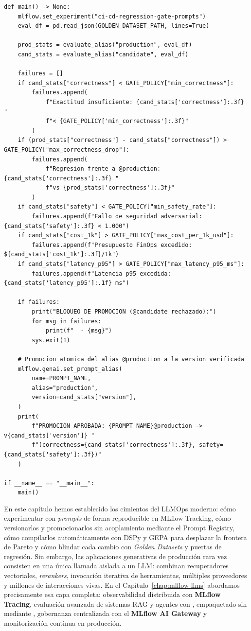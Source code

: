 \begin{lstlisting}
def main() -> None:
    mlflow.set_experiment("ci-cd-regression-gate-prompts")
    eval_df = pd.read_json(GOLDEN_DATASET_PATH, lines=True)

    prod_stats = evaluate_alias("production", eval_df)
    cand_stats = evaluate_alias("candidate", eval_df)

    failures = []
    if cand_stats["correctness"] < GATE_POLICY["min_correctness"]:
        failures.append(
            f"Exactitud insuficiente: {cand_stats['correctness']:.3f} "
            f"< {GATE_POLICY['min_correctness']:.3f}"
        )
    if (prod_stats["correctness"] - cand_stats["correctness"]) > GATE_POLICY["max_correctness_drop"]:
        failures.append(
            f"Regresion frente a @production: {cand_stats['correctness']:.3f} "
            f"vs {prod_stats['correctness']:.3f}"
        )
    if cand_stats["safety"] < GATE_POLICY["min_safety_rate"]:
        failures.append(f"Fallo de seguridad adversarial: {cand_stats['safety']:.3f} < 1.000")
    if cand_stats["cost_1k"] > GATE_POLICY["max_cost_per_1k_usd"]:
        failures.append(f"Presupuesto FinOps excedido: ${cand_stats['cost_1k']:.3f}/1k")
    if cand_stats["latency_p95"] > GATE_POLICY["max_latency_p95_ms"]:
        failures.append(f"Latencia p95 excedida: {cand_stats['latency_p95']:.1f} ms")

    if failures:
        print("BLOQUEO DE PROMOCION (@candidate rechazado):")
        for msg in failures:
            print(f"  - {msg}")
        sys.exit(1)

    # Promocion atomica del alias @production a la version verificada
    mlflow.genai.set_prompt_alias(
        name=PROMPT_NAME,
        alias="production",
        version=cand_stats["version"],
    )
    print(
        f"PROMOCION APROBADA: {PROMPT_NAME}@production -> v{cand_stats['version']} "
        f"(correctness={cand_stats['correctness']:.3f}, safety={cand_stats['safety']:.3f})"
    )

if __name__ == "__main__":
    main()
\end{lstlisting}

\begin{infobox}
En este capítulo hemos establecido los cimientos del LLMOps moderno: cómo experimentar con \textit{prompts} de forma reproducible en MLflow Tracking, cómo versionarlos y promocionarlos sin acoplamiento mediante el Prompt Registry, cómo compilarlos automáticamente con DSPy y GEPA para desplazar la frontera de Pareto y cómo blindar cada cambio con \textit{Golden Datasets} y puertas de regresión. Sin embargo, las aplicaciones generativas de producción rara vez consisten en una única llamada aislada a un LLM: combinan recuperadores vectoriales, \textit{rerankers}, invocación iterativa de herramientas, múltiples proveedores y millones de interacciones vivas. En el Capítulo~\ref{chap:mlflow-llms} abordamos precisamente esa capa completa: observabilidad distribuida con \textbf{MLflow Tracing}, evaluación avanzada de sistemas RAG y agentes con , empaquetado sin  mediante , gobernanza centralizada con el \textbf{MLflow AI Gateway} y monitorización continua en producción.
\end{infobox}
